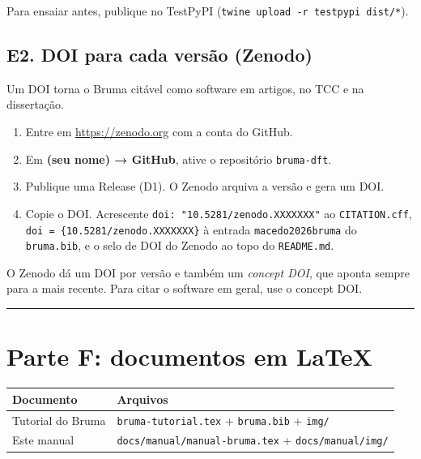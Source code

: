 \documentclass[
  10pt,
]{article}
\providecommand{\tightlist}{%
  \setlength{\itemsep}{0pt}\setlength{\parskip}{0pt}}
\begin{document}
Para ensaiar antes, publique no TestPyPI
(\texttt{twine upload -\allowbreak{}r testpypi dist/\allowbreak{}*}).

\hypertarget{e2.-doi-para-cada-versuxe3o-zenodo}{%
\subsection{E2. DOI para cada versão
(Zenodo)}\label{e2.-doi-para-cada-versuxe3o-zenodo}}

Um DOI torna o Bruma citável como software em artigos, no TCC e na
dissertação.

\begin{enumerate}
\def\labelenumi{\arabic{enumi}.}
\tightlist
\item
  Entre em \url{https://zenodo.org} com a conta do GitHub.
\item
  Em \textbf{(seu nome) → GitHub}, ative o repositório
  \texttt{bruma-\allowbreak{}dft}.
\item
  Publique uma Release (D1). O Zenodo arquiva a versão e gera um DOI.
\item
  Copie o DOI. Acrescente
  \texttt{doi:\allowbreak{} "10.\allowbreak{}5281/\allowbreak{}zenodo.\allowbreak{}XXXXXXX"}
  ao \texttt{CITATION.\allowbreak{}cff},
  \texttt{doi = \{10.\allowbreak{}5281/\allowbreak{}zenodo.\allowbreak{}XXXXXXX\}}
  à entrada \texttt{macedo2026bruma} do \texttt{bruma.\allowbreak{}bib},
  e o selo de DOI do Zenodo ao topo do \texttt{README.\allowbreak{}md}.
\end{enumerate}

O Zenodo dá um DOI por versão e também um \emph{concept DOI}, que aponta
sempre para a mais recente. Para citar o software em geral, use o
concept DOI.

\begin{center}\rule{0.5\linewidth}{0.5pt}\end{center}

\hypertarget{parte-f-documentos-em-latex}{%
\section{Parte F: documentos em
LaTeX}\label{parte-f-documentos-em-latex}}

\begin{longtable}[]{@{}ll@{}}
\toprule\noalign{}
Documento & Arquivos \\
\midrule\noalign{}
\endhead
\bottomrule\noalign{}
\endlastfoot
Tutorial do Bruma &
\texttt{bruma-\allowbreak{}tutorial.\allowbreak{}tex} +
\texttt{bruma.\allowbreak{}bib} + \texttt{img/\allowbreak{}} \\
Este manual &
\texttt{docs/\allowbreak{}manual/\allowbreak{}manual-\allowbreak{}bruma.\allowbreak{}tex}
+ \texttt{docs/\allowbreak{}manual/\allowbreak{}img/\allowbreak{}} \\
\end{longtable}
\end{document}
